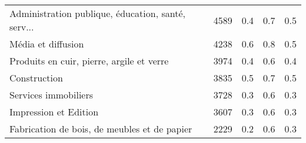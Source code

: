 \begin{tabular}{lrrrr}
Administration publique, éducation, santé, serv... &          4589 &     0.4 &  0.7 &      0.5 \\
Média et diffusion                                 &          4238 &     0.6 &  0.8 &      0.5 \\
Produits en cuir, pierre, argile et verre          &          3974 &     0.4 &  0.6 &      0.4 \\
Construction                                       &          3835 &     0.5 &  0.7 &      0.5 \\
Services immobiliers                               &          3728 &     0.3 &  0.6 &      0.3 \\
Impression et Edition                              &          3607 &     0.3 &  0.6 &      0.3 \\
Fabrication de bois, de meubles et de papier       &          2229 &     0.2 &  0.6 &      0.3 \\
\bottomrule
\end{tabular}
